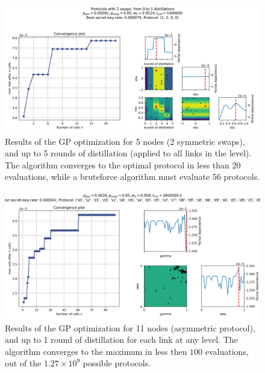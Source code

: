 \documentclass{article}
\begin{document}
\begin{figure}[ht!]
  \centering
  \includegraphics[width=\linewidth, trim = 10 10 10 50, clip]{symmetric/results_gp_centerspace/0.9524_2_swaps_skopt_gp.png}
  \caption{Results of the GP optimization for 5 nodes (2 symmetric swaps), and up to 5 rounds of distillation (applied to all links in the level). The algorithm converges to the optimal protocol in less than 20 evaluations, while a bruteforce algorithm must evaluate 56 protocols.}
  \label{fig:symmetric_5_nodes}
\end{figure}

\begin{figure}[ht!]
  \centering
  \includegraphics[width=\linewidth, trim = 10 10 10 50, clip]{asymmetric/gp11,1/skopt_gp.png}
  \caption{Results of the GP optimization for 11 nodes (asymmetric protocol), and up to 1 round of distillation for each link at any level. The algorithm converges to the maximum in less then $100$ evaluations, out of the $1.27 \times 10^9$ possible protocols.}
  \label{fig:asymmetric_11_nodes}
\end{figure}
\end{document}

